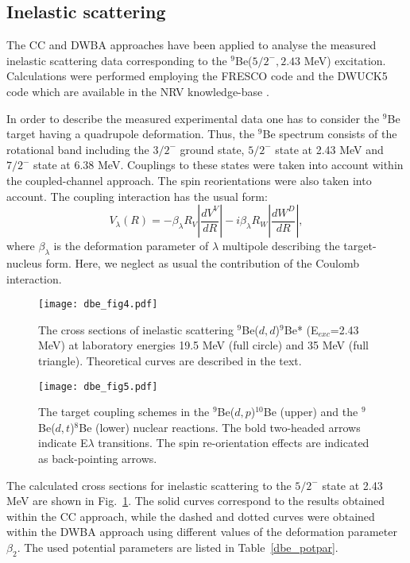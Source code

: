 \documentclass[
12pt, %
oneside, %
english, %
onehalfspacing, %
onehalfspacing, %
headsepline, %
]{MastersDoctoralThesis} %
\begin{document}
\subsection{Inelastic scattering}
The CC and DWBA approaches have been applied to analyse the measured inelastic scattering data corresponding to the ${}^9$Be($5/2^-, 2.43$ MeV) excitation. Calculations were performed employing the FRESCO code \cite{fresco} and the DWUCK5 code \cite{kunz} which are available in the NRV knowledge-base \cite{nrv}.

In order to describe the measured experimental data one has to consider the ${}^9$Be target having a quadrupole deformation. Thus, the ${}^9$Be spectrum consists of the rotational band including the  $3/2^-$ ground state, $5/2^-$ state at 2.43 MeV and $7/2^-$ state at 6.38 MeV. Couplings to these states were taken into account within the coupled-channel approach. The spin reorientations were also taken into account. The coupling interaction has the usual form:
\begin{equation}
V_\lambda(R)=-\beta_\lambda R_V \left|\frac{d V^V}{dR}\right| - i \beta_\lambda R_W \left|\frac{d W^D}{dR}\right|,
\end{equation}
where $\beta_\lambda$ is the deformation parameter of $\lambda$ multipole describing the target-nucleus form. Here, we neglect as usual the contribution of the Coulomb interaction.

\begin{figure}[tp]
\centering
\texttt{[image: dbe\_fig4.pdf]}
\decoRule
\caption{\label{dbe_fig4} \footnotesize The cross sections of inelastic scattering ${}^9$Be($d,d$)$^9$Be* (E$_{exc}$=2.43 MeV) at laboratory energies 19.5 MeV (full circle) and 35 MeV (full triangle). Theoretical curves are described in the text.}
\end{figure} 


\begin{figure}[bp]
\centering
\texttt{[image: dbe\_fig5.pdf]}
\decoRule
\caption{ \label{dbe_fig5} \footnotesize The target coupling schemes in the ${}^9$Be($d,p$)$^{10}$Be (upper) and the ${}^9$Be($d,t$)$^8$Be (lower) nuclear reactions. The bold two-headed arrows indicate E$\lambda$ transitions. The spin re-orientation effects are indicated as back-pointing arrows.}
\end{figure} 

The calculated cross sections for inelastic scattering to the $5/2^-$ state at 2.43 MeV are shown in Fig.~\ref{dbe_fig4}. The solid curves correspond to the results obtained within the CC approach, while the dashed and dotted curves were obtained within the DWBA approach using  different values of the deformation parameter $\beta_2$. The used potential parameters are listed in Table~\ref{dbe_potpar}.
\end{document}
